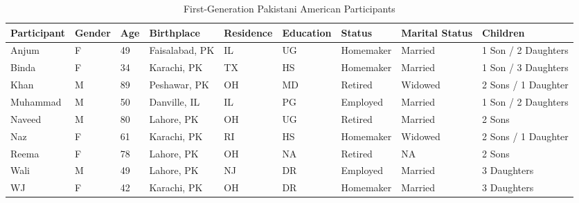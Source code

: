 \begin{landscape}
\thispagestyle{lscape} %
\begin{table}[p]
\centering
\caption{First-Generation Pakistani American Participants}
\label{tab:first-generation}
\begin{tabular}{|l|l|l|l|l|l|l|l|l|}
\hline
\textbf{Participant} & \textbf{Gender} & \textbf{Age} & \textbf{Birthplace} & \textbf{Residence} & \textbf{Education} & \textbf{Status} & \textbf{Marital   Status} & \textbf{Children}   \\ \hline
Anjum                & F               & 49           & Faisalabad, PK      & IL                 & UG                 & Homemaker       & Married                   & 1 Son / 2 Daughters \\ \hline
Binda                & F               & 34           & Karachi, PK         & TX                 & HS                 & Homemaker       & Married                   & 1 Son / 3 Daughters \\ \hline
Khan                 & M               & 89           & Peshawar, PK        & OH                 & MD                 & Retired         & Widowed                   & 2 Sons / 1 Daughter \\ \hline
Muhammad             & M               & 50           & Danville, IL        & IL                 & PG                 & Employed        & Married                   & 1 Son / 2 Daughters \\ \hline
Naveed               & M               & 80           & Lahore, PK          & OH                 & UG                 & Retired         & Married                   & 2 Sons              \\ \hline
Naz                  & F               & 61           & Karachi, PK         & RI                 & HS                 & Homemaker       & Widowed                   & 2 Sons / 1 Daughter \\ \hline
Reema                & F               & 78           & Lahore, PK          & OH                 & NA                 & Retired         & NA                        & 2 Sons              \\ \hline
Wali                 & M               & 49           & Lahore, PK          & NJ                 & DR                 & Employed        & Married                   & 3 Daughters         \\ \hline
WJ                   & F               & 42           & Karachi, PK         & OH                 & DR                 & Homemaker       & Married                   & 3 Daughters         \\ \hline

\end{tabular}
\end{table}
\end{landscape}
